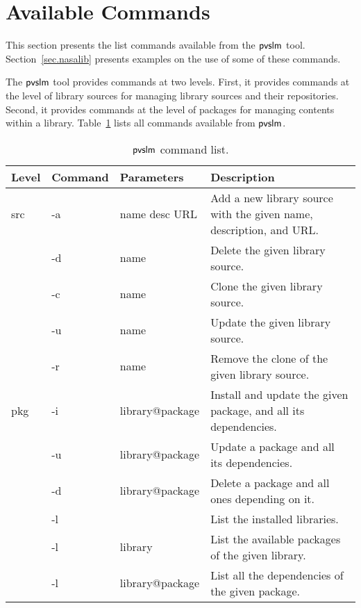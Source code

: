 \section{Available Commands}
\label{sec.cmd}

This section presents the list commands available from the $\textsf{pvslm}$
tool. Section~\ref{sec.nasalib} presents examples on the use of some
of these commands.

The $\textsf{pvslm}$ tool provides commands at two levels. First, it provides
commands at the level of library sources for managing library sources
and their repositories.  Second, it provides commands at the level of
packages for managing contents within a library. Table~\ref{tab.cmd}
lists all commands available from $\textsf{pvslm}$.

\begin{table}[h!]
  \begin{center}
    \begin{tabular}{ | l | l | l | p{5cm} | }
      \hline Level & Command & Parameters & Description \\ \hline
      src & -a          & name desc URL         & Add a new library source with the given name, description, and URL.                   \\ \cline{2-4}
          & -d          & name                  & Delete the given library source.                                          \\ \cline{2-4}
          & -c          & name                  & Clone the given library source.                          \\ \cline{2-4}
          & -u          & name                  & Update the given library source.                                \\ \cline{2-4}
          & -r          & name                  & Remove the clone of the given library source.                                                  \\ \hline
      pkg & -i          & library@package       & Install and update the given package, and all its dependencies.                \\ \cline{2-4}
          & -u          & library@package       & Update a package and all its dependencies.                   \\ \cline{2-4}
          & -d          & library@package       & Delete a  package and all ones depending on it.           \\ \cline{2-4}
          & -l          &                       & List the installed libraries.                                       \\ \cline{2-4}
          & -l          & library               & List the available packages of the given library.                         \\ \cline{2-4}
          & -l          & library@package       & List all the dependencies of the given package.                               \\ \hline
    \end{tabular}
  \end{center}
  \caption{$\textsf{pvslm}$ command list.}
  \label{tab.cmd}
\end{table}

